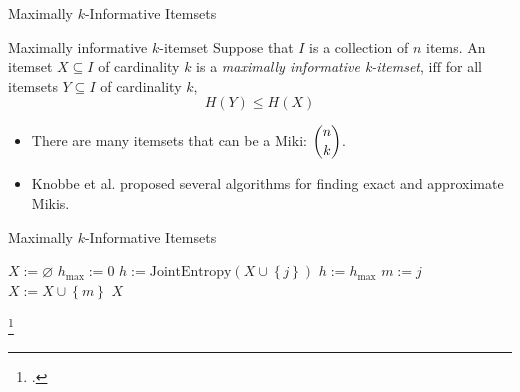 \documentclass[12pt]{beamer}
\theoremstyle{break}
\newcommand*{\To}{\:\bm{ to }\:}
\begin{document}


\begin{frame}{Maximally $k$-Informative Itemsets}

	\begin{block}{Maximally informative $k$-itemset}
	    Suppose that $I$ is a collection of $n$ items. An itemset $X \subseteq I$ of cardinality $k$ is a \emph{maximally informative k-itemset}, $\mathrm{iff}$ for all itemsets $Y \subseteq I$ of cardinality $k$,
	    \begin{equation*}
	        H(Y) \leq H(X)
	    \end{equation*}
	\end{block}
	
	\pause
	
	\begin{itemize}
		\item There are many itemsets that can be a Miki: $\dbinom{n}{k}$.
		\item Knobbe et al. proposed several algorithms for finding exact and approximate Mikis.
	\end{itemize}

\end{frame}




\begin{frame}{Maximally $k$-Informative Itemsets}

	\begin{center}
		\begin{algorithmic}[1]
	        \State $X:=\varnothing$
	        \For{$i:=1 \To k$}
	            \State $h_{\mathrm{max}}:=0$
	            \For{$j:=1 \To n$}
	                \State $h:=\textrm{JointEntropy}(X \cup \left\{j\right\})$
	                    \State $h:=h_{\mathrm{max}}$
	                    \State $m:=j$
	                    \State $X:=X \cup \left\{m\right\}$
	                \EndIf
	            \EndFor
	        \EndFor
	        \State \Return $X$
	    \EndFunction
		\end{algorithmic}
	\end{center}
	
	\footcitetext{Knobbe2006}
	
\end{frame}


\end{document}
